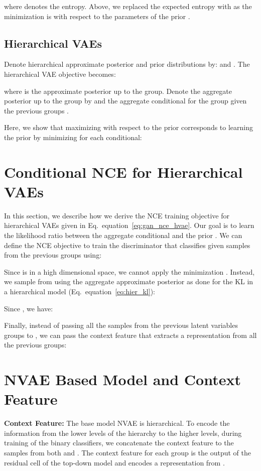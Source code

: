 \documentclass{article} \usepackage{iclr2021_conference,times}
\def\eqref#1{equation~\ref{#1}}
\begin{document}
where  denotes the entropy. Above, we  replaced the expected entropy  with  as the minimization is with respect to the parameters of the prior . 


\subsection{Hierarchical VAEs}\label{app:hvae_prior}
Denote hierarchical approximate posterior and prior distributions by:  and . The hierarchical VAE objective becomes:

where  is the approximate posterior up to the  group. Denote the aggregate posterior up to the  group by  and the aggregate conditional for the  group given the previous groups .

Here, we show that maximizing  with respect to the prior corresponds to learning the prior by minimizing  for each conditional:



\section{Conditional NCE for Hierarchical VAEs} \label{app:cnce}
In this section, we describe how we derive the NCE training objective for hierarchical VAEs given in Eq.~\eqref{eq:gan_nce_hvae}. Our goal is to learn the likelihood ratio between the aggregate conditional  and the prior . We can define the NCE objective to train the discriminator  that classifies  given samples from the previous groups  using:

Since  is in a high dimensional space, we cannot apply the minimization . Instead, we sample from  using the aggregate approximate posterior  as done for the KL in a  hierarchical model (Eq.~\eqref{eq:hier_kl}):

Since , we have:

Finally, instead of passing all the samples from the previous latent variables groups to , we can pass the context feature  that extracts a representation from all the previous groups:




\section{NVAE Based Model and Context Feature} \label{app:context s}

\textbf{Context Feature:} The base model NVAE \citep{vahdat2020NVAE} is hierarchical.  To encode the information from the lower levels of the hierarchy to the higher levels, during training of the binary classifiers, we concatenate the context feature  to the samples from both  and . The context feature for each group is the output of the residual cell of the top-down model and encodes a representation from . 
\end{document}
